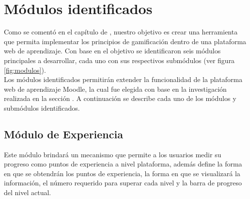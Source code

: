 
\section{Módulos identificados}
\label{analisis:modulos}

 Como se comentó en el capítulo de , nuestro
 objetivo es crear una herramienta que permita implementar los principios de
 gamificación dentro de una plataforma web de aprendizaje. Con base en el objetivo
 se identificaron seis módulos principales a desarrollar, cada uno con sus
 respectivos submódulos (ver figura \ref{fig:modulos}).\\

 \noindent
 Los módulos identificados permitirán extender la funcionalidad de la plataforma web
 de aprendizaje Moodle, la cual fue elegida con base en la investigación realizada en
 la sección . A continuación se describe cada uno de los módulos y
 submódulos identificados.\\







\subsection*{Módulo de Experiencia}

 Este módulo brindará un mecanismo que permite a los usuarios medir su progreso
 como puntos de experiencia a nivel plataforma, además define la forma en que se
 obtendrán los puntos de experiencia, la forma en que se visualizará la información,
 el número requerido para superar cada nivel y la barra de progreso del nivel
 actual.



